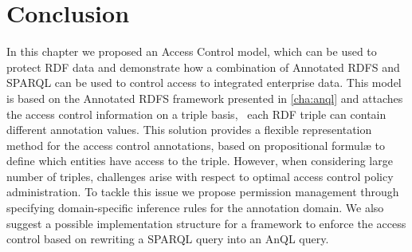                  
\section{Conclusion}

In this chapter we proposed an Access Control model, which can be used to protect \ac{RDF} data and demonstrate how a
combination of Annotated RDFS and SPARQL can be used to control access to integrated enterprise data.
%
This model is based on the Annotated RDFS framework presented in \cref{cha:anql} and attaches the access control
information on a triple basis, \ie~each \ac{RDF} triple can contain different annotation values.  
%
This solution provides a flexible representation method for the access control annotations, based on propositional
formul\ae{} to define which entities have access to the triple.
%
However, when considering large number of triples, challenges arise with respect to optimal access control policy
administration.  To tackle this issue we propose permission management through specifying domain-specific inference
rules for the annotation domain.
%
We also suggest a possible implementation structure for a framework to enforce the access control based on rewriting a
SPARQL query into an AnQL query.





